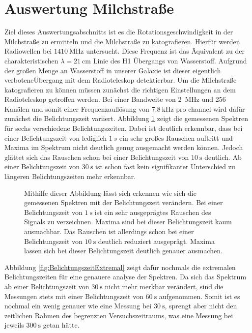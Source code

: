 \section{Auswertung Milchstraße}
Ziel dieses Auswertungsabschnitts ist es die Rotationsgeschwindigkeit in der Milchstraße zu ermitteln und die Milchstraße zu katografieren.\newline
Hierfür werden Radiowellen bei $\SI{1410}{\mega \hertz}$ untersucht. Diese Frequenz ist das Äquivalent zu der charakteristischen $\lambda = \SI{21}{\centi \metre}$ Linie des H1 Übergangs von Wasserstoff. Aufgrund der großen Menge an Wasserstoff in unserer Galaxie ist dieser eigentlich \dq verbotene\dq  Übergang mit dem Radioteleskop detektierbar.\newline
Um die Milchstraße katografieren zu können müssen zunächst die richtigen Einstellungen an dem Radioteleskop getroffen werden. Bei einer Bandweite von \SI{2}{MHz} und 256 Kanälen und somit einer Frequenzauflösung von $\SI{7.8}{\kilo \hertz}$ pro channel \cite{Usermanual} wird dafür zunächst die Belichtungszeit variiert. Abbildung \ref{fig:Belichtungszeit} zeigt die gemessenen Spektren für sechs verschiedene Belichtungszeiten. Dabei ist deutlich erkennbar, dass bei einer Belichtungszeit von lediglich $\SI{1}{s}$ ein sehr großes Rauschen auftritt und Maxima im Spektrum nicht deutlich genug ausgemacht werden können. Jedoch glättet sich das Rauschen schon bei einer Belichtungszeit von $\SI{10}{\second}$ deutlich. Ab einer Belichtungszeit von $\SI{30}{\second}$ ist schon fast kein signifikanter Unterschied zu längeren Belichtungszeiten mehr erkennbar.
\begin{figure}[H]
    \centering
       
    \caption[Gemessenen Spektren bei verschiedenen Belichtungszeiten]{Mithilfe dieser Abbildung lässt sich erkennen wie sich die gemessenen Spektren mit der Belichtungszeit verändern. Bei einer Belichtungszeit von $\SI{1}{\second}$ ist ein sehr ausgeprägtes Rauschen des Signals zu verzeichnen. Maxima sind bei dieser Belichtungszeit kaum ausmachbar. Das Rauschen ist allerdings schon bei einer Belichtungszeit von $\SI{10}{\second}$ deutlich reduziert ausgeprägt. Maxima lassen sich bei dieser Belichtungszeit deutlich genauer ausmachen.}
    \label{fig:Belichtungszeit}
\end{figure}
Abbildung \ref{fig:BelichtungszeitExtremal} zeigt dafür nochmals die extremalen Belichtungszeiten für eine genauere analyse der Spektren. Da sich das Spektrum ab einer Belichtungszeit von $\SI{30}{\second}$ nicht mehr merkbar verändert, sind die Messungen stets mit einer Belichtungszeit von $\SI{60}{\second}$ aufgenommen. Somit ist es nochmal ein wenig genauer wie eine Messung bei $\SI{30}{\second}$, sprengt aber nicht den zeitlichen Rahmen des begrenzten Versuchszeitraums, was eine Messung bei jeweils $\SI{300}{\second}$ getan hätte.
